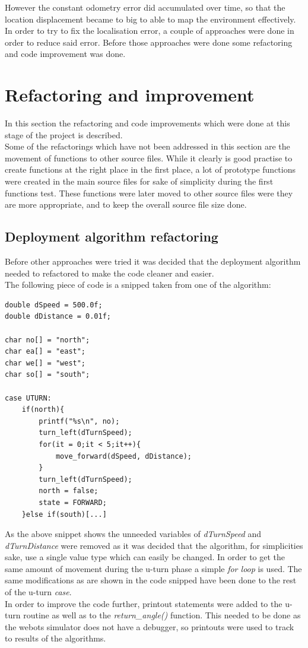 However the constant odometry error did accumulated over time, so that the location displacement became to big to able to map the environment effectively. \\
In order to try to fix the localisation error, a couple of approaches were done in order to reduce said error. Before those approaches were done some refactoring and code improvement was done.

\section{Refactoring and improvement}
In this section the refactoring and code improvements which were done at this stage of the project is described. \\
Some of the refactorings which have not been addressed in this section are the movement of functions to other source files.
While it clearly is good practise to create functions at the right place in the first place, a lot of prototype functions were created in the main source files for sake of simplicity during the first functions test. These functions were later moved to other source files were they are more appropriate, and to keep the overall source file size done.

\subsection{Deployment algorithm refactoring}
Before other approaches were tried it was decided that the deployment algorithm needed to refactored to make the code cleaner and easier. \\
The following piece of code is a snipped taken from one of the algorithm:

\begin{lstlisting}[caption={Deployment algorithm refactoring}]
double dSpeed = 500.0f;
double dDistance = 0.01f;

char no[] = "north";
char ea[] = "east";
char we[] = "west";
char so[] = "south";

case UTURN:
    if(north){
        printf("%s\n", no);
        turn_left(dTurnSpeed);
        for(it = 0;it < 5;it++){
            move_forward(dSpeed, dDistance);
        }
        turn_left(dTurnSpeed);
        north = false;
        state = FORWARD;
    }else if(south)[...]
\end{lstlisting}

As the above snippet shows the unneeded variables of \textit{dTurnSpeed} and \textit{dTurnDistance} were removed as it was decided that the algorithm, for simplicities sake, use a single value type which can easily be changed. In order to get the same amount of movement during the u-turn phase a simple \textit{for loop} is used. The same modifications as are shown in the code snipped have been done to the rest of the u-turn \textit{case}. \\
In order to improve the code further, printout statements were added to the u-turn routine as well as to the \textit{return\_angle()} function.
This needed to be done as the webots simulator does not have a debugger, so printouts were used to track to results of the algorithms.


